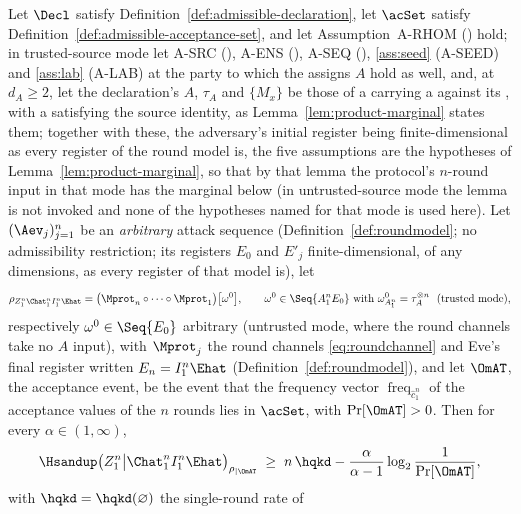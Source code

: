 \begin{theorem}\label{thm:accumulated-entropy}
Let $\Decl$ satisfy Definition~\ref{def:admissible-declaration}, let
$\acSet$ satisfy Definition~\ref{def:admissible-acceptance-set}, and let
Assumption~A-RHOM () hold; in
trusted-source mode let A-SRC
(), A-ENS (), A-SEQ
(), \ref{ass:seed} (A-SEED) and
\ref{ass:lab} (A-LAB) at the party to which the 
assigns $A$ hold as well, and, at $d_A\ge2$, let the declaration's $A$,
$\tau_A$ and $\{M_x\}$ be those of a  carrying a
 against its ,
with a  satisfying the source identity, as
Lemma~\ref{lem:product-marginal} states them; together with these, the
adversary's initial register being finite-dimensional as every register of
the round model is, the five assumptions are the hypotheses of
Lemma~\ref{lem:product-marginal}, so that by that lemma the
protocol's $n$-round input in that mode has the marginal below (in
untrusted-source mode the lemma is not invoked and none of the hypotheses
named for that mode is used here). Let $(\Aev_j)_{j=1}^{n}$ be an
\emph{arbitrary} attack sequence (Definition~\ref{def:roundmodel}; no
admissibility restriction; its registers $E_0$ and $E'_j$ finite-dimensional,
of any dimensions, as every register of that model is), let
\begin{equation*}
  \rho_{Z_1^n\Chat_1^nI_1^n\Ehat}
  =\big(\Mprot_n\circ\dots\circ\Mprot_1\big)\big[\omega^{0}\big],
  \qquad
  \omega^{0}\in\Seq{A_1^nE_0}\ \text{with}\
  \omega^{0}_{A_1^n}=\tau_A^{\otimes n}
  \ \ \text{(trusted mode)},
\end{equation*}
respectively $\omega^{0}\in\Seq{E_0}$ arbitrary (untrusted mode, where
the round channels take no $A$ input),
with $\Mprot_j$ the round channels \eqref{eq:roundchannel} and Eve's
final register written $E_n=I_1^n\Ehat$
(Definition~\ref{def:roundmodel}), and let $\OmAT$, the acceptance event, be
the event that the frequency vector $\operatorname{freq}_{\hat c_1^n}$ of the
acceptance values of the $n$ rounds lies in $\acSet$, with $\Pr[\OmAT]>0$.
Then for
every $\alpha\in(1,\infty)$,
\begin{equation}\label{eq:c3}
  \Hsandup\big(Z_1^n\big|\Chat_1^nI_1^n\Ehat\big)_{\rho_{|\OmAT}}
  \;\ge\;n\,\hqkd-\frac{\alpha}{\alpha-1}\log_2\frac{1}{\Pr[\OmAT]},
\end{equation}
with $\hqkd=\hqkd(\varnothing)$ the single-round rate of

\end{theorem}
